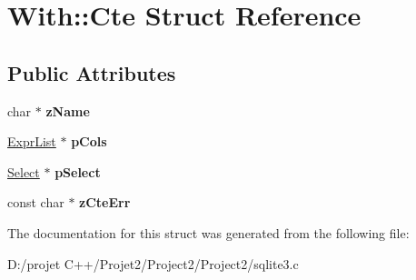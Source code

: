 \hypertarget{struct_with_1_1_cte}{}\section{With\+:\+:Cte Struct Reference}
\label{struct_with_1_1_cte}
\subsection*{Public Attributes}
\begin{DoxyCompactItemize}
\item 
\mbox{\label{struct_with_1_1_cte_a3ce66361944f92f0d3fc354025320dd6}} 
char $\ast$ {\bfseries z\+Name}
\item 
\mbox{\label{struct_with_1_1_cte_a9e43b7bf43ff5878c465f683fc464456}} 
\mbox{\hyperlink{struct_expr_list}{Expr\+List}} $\ast$ {\bfseries p\+Cols}
\item 
\mbox{\label{struct_with_1_1_cte_a90fd9f2a4529a6fd1e75cabeccec16cd}} 
\mbox{\hyperlink{struct_select}{Select}} $\ast$ {\bfseries p\+Select}
\item 
\mbox{\label{struct_with_1_1_cte_a2e0558ed352afe93f08cb8a9ed407223}} 
const char $\ast$ {\bfseries z\+Cte\+Err}
\end{DoxyCompactItemize}


The documentation for this struct was generated from the following file\+:\begin{DoxyCompactItemize}
\item 
D\+:/projet C++/\+Projet2/\+Project2/\+Project2/sqlite3.\+c\end{DoxyCompactItemize}
